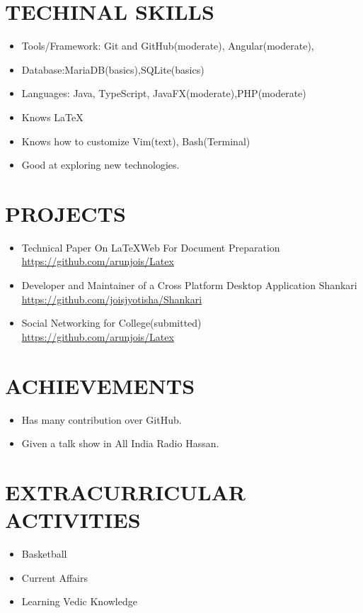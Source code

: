 \documentclass{res}
\begin{document}
\begin{resume}
		\section{TECHINAL SKILLS}
		\begin{itemize}
			\item Tools/Framework: Git and GitHub(moderate),  Angular(moderate),
			\item Database:MariaDB(basics),SQLite(basics)
			\item Languages: Java, TypeScript, JavaFX(moderate),PHP(moderate) 
			\item Knows \LaTeX
			\item Knows how to customize Vim(text), Bash(Terminal)
			\item Good at exploring new technologies.
		\end{itemize}        
		
		
		\section{PROJECTS}
		\begin{itemize}
			\item Technical Paper On \LaTeX Web For Document Preparation \\
			\href {https://github.com/arunjois/Latex}{https://github.com/arunjois/Latex}
			
			\item Developer and Maintainer of a Cross Platform Desktop Application Shankari\\
			\href {https://github.com/joisjotisha/Shankari}{https://github.com/joisjyotisha/Shankari}
			
			\item Social Networking for College(submitted) \\
			\href{https://github.com/arunjois/Latex}{https://github.com/arunjois/Latex}
		\end{itemize}          
		\section{ACHIEVEMENTS}
		\begin{itemize}
			\item Has many contribution over GitHub.
			\item Given a talk show in All India Radio Hassan. 
		\end{itemize} 
		\section{EXTRACURRICULAR ACTIVITIES}
		\begin{itemize}
			\item Basketball
			\item Current Affairs
			\item Learning Vedic Knowledge 
		\end{itemize}       
		
	\end{resume}
\end{document}

